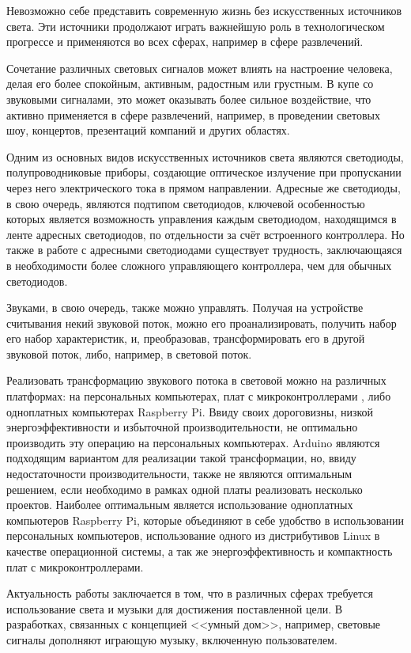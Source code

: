 \intro

Невозможно себе представить современную жизнь без искусственных источников света. Эти источники продолжают играть важнейшую роль в технологическом прогрессе и применяются во всех сферах, например в сфере развлечений.

Сочетание различных световых сигналов может влиять на настроение человека, делая его более спокойным, активным, радостным или грустным. В купе со звуковыми сигналами, это может оказывать более сильное воздействие, что активно применяется в сфере развлечений, например, в проведении световых шоу, концертов, презентаций компаний и других областях.

Одним из основных видов искусственных источников света являются светодиоды, полупроводниковые приборы, создающие оптическое излучение при пропускании через него электрического тока в прямом направлении. Адресные же светодиоды, в свою очередь, являются подтипом светодиодов, ключевой особенностью которых является возможность управления каждым светодиодом, находящимся в ленте адресных светодиодов, по отдельности за счёт встроенного контроллера. Но также в работе с адресными светодиодами существует трудность, заключающаяся в необходимости более сложного управляющего контроллера, чем для обычных светодиодов.

Звуками, в свою очередь, также можно управлять. Получая на устройстве считывания некий звуковой поток, можно его проанализировать, получить набор его набор характеристик, и, преобразовав, трансформировать его в другой звуковой поток, либо, например, в световой поток.

Реализовать трансформацию звукового потока в световой можно на различных платформах: на персональных компьютерах, плат с микроконтроллерами , либо одноплатных компьютерах Raspberry Pi. Ввиду своих дороговизны, низкой энергоэффективности и избыточной производительности, не оптимально производить эту операцию на персональных компьютерах. Arduino являются подходящим вариантом для реализации такой трансформации, но, ввиду недостаточности производительности, также не являются оптимальным решением, если необходимо в рамках одной платы реализовать несколько проектов. Наиболее оптимальным является использование одноплатных компьютеров Raspberry Pi, которые объединяют в себе удобство в использовании персональных компьютеров, использование одного из дистрибутивов Linux в качестве операционной системы, а так же энергоэффективность и компактность плат с микроконтроллерами.

Актуальность работы заключается в том, что в различных сферах требуется использование света и музыки для достижения поставленной цели. В разработках, связанных с концепцией <<умный дом>>, например, световые сигналы дополняют играющую музыку, включенную пользователем.

